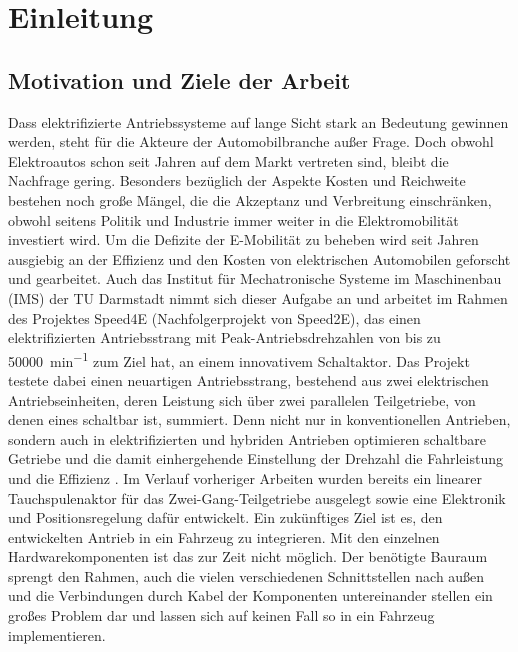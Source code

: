 \chapter{Einleitung}\label{kap1}
\section{Motivation und Ziele der Arbeit}
Dass elektrifizierte Antriebssysteme auf lange Sicht stark an Bedeutung gewinnen werden, steht für die Akteure der Automobilbranche außer Frage. Doch obwohl Elektroautos schon seit Jahren auf dem Markt vertreten sind, bleibt die Nachfrage gering. Besonders bezüglich der Aspekte Kosten und Reichweite bestehen noch große Mängel, die die Akzeptanz und Verbreitung einschränken, obwohl seitens Politik und Industrie immer weiter in die Elektromobilität investiert wird. Um die Defizite der E-Mobilität zu beheben wird seit Jahren ausgiebig an der Effizienz und den Kosten von elektrischen Automobilen geforscht und gearbeitet.
Auch das Institut für Mechatronische Systeme im Maschinenbau (IMS) der TU Darmstadt nimmt sich dieser Aufgabe an und arbeitet im Rahmen des Projektes Speed4E (Nachfolgerprojekt von Speed2E), das einen elektrifizierten Antriebsstrang mit Peak-Antriebsdrehzahlen von bis zu \SI{50 000}{min^{-1}} zum Ziel hat, an einem innovativem Schaltaktor. Das Projekt testete dabei einen neuartigen Antriebsstrang, bestehend aus zwei elektrischen Antriebseinheiten, deren Leistung sich über zwei parallelen Teilgetriebe, von denen eines schaltbar ist, summiert. Denn nicht nur in konventionellen Antrieben, sondern auch in elektrifizierten und hybriden Antrieben optimieren schaltbare Getriebe und die damit einhergehende Einstellung der Drehzahl die Fahrleistung und die Effizienz \cite{Tsch14}.
  Im Verlauf vorheriger Arbeiten wurden bereits ein linearer Tauchspulenaktor für das Zwei-Gang-Teilgetriebe ausgelegt sowie eine Elektronik und Positionsregelung dafür entwickelt. Ein zukünftiges Ziel ist es, den entwickelten Antrieb in ein Fahrzeug zu integrieren. Mit den einzelnen Hardwarekomponenten ist das zur Zeit nicht möglich. Der benötigte Bauraum sprengt den Rahmen, auch die vielen verschiedenen Schnittstellen nach außen und die Verbindungen durch Kabel der Komponenten untereinander stellen ein großes Problem dar und lassen sich auf keinen Fall so in ein Fahrzeug implementieren.
